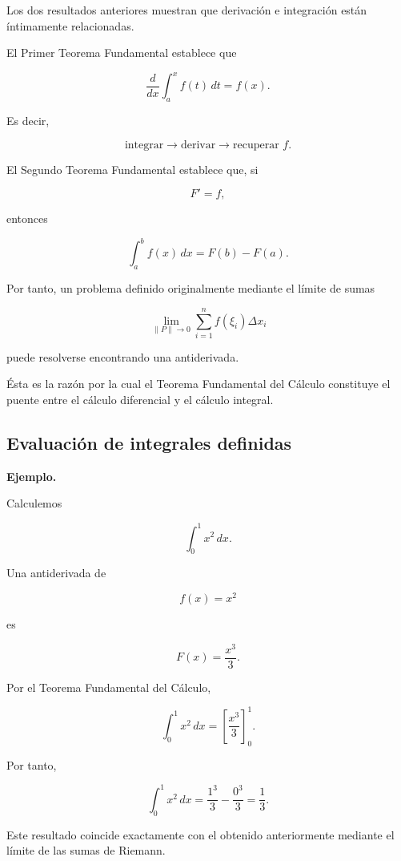 \documentclass[12pt]{article}
\newenvironment{Ejem}
{\par\medskip\noindent\textbf{Ejemplo.}\ }
{\par\medskip}
\begin{document}
Los dos resultados anteriores muestran que derivación e integración están
íntimamente relacionadas.

El Primer Teorema Fundamental establece que

\[
\boxed{
\frac{d}{dx}
\int_a^x f(t)\,dt
=
f(x).
}
\]

Es decir,

\[
\text{integrar}
\longrightarrow
\text{derivar}
\longrightarrow
\text{recuperar }f.
\]

El Segundo Teorema Fundamental establece que, si

\[
F'=f,
\]

entonces

\[
\boxed{
\int_a^b f(x)\,dx
=
F(b)-F(a).
}
\]

Por tanto, un problema definido originalmente mediante el límite de sumas

\[
\lim_{\|P\|\to0}
\sum_{i=1}^{n}f(\xi_i)\Delta x_i
\]

puede resolverse encontrando una antiderivada.

Ésta es la razón por la cual el Teorema Fundamental del Cálculo constituye
el puente entre el cálculo diferencial y el cálculo integral.

\subsection{Evaluación de integrales definidas}

\begin{Ejem}

Calculemos

\[
\int_0^1 x^2\,dx.
\]

Una antiderivada de

\[
f(x)=x^2
\]

es

\[
F(x)=\frac{x^3}{3}.
\]

Por el Teorema Fundamental del Cálculo,

\[
\int_0^1x^2\,dx
=
\left[
\frac{x^3}{3}
\right]_0^1.
\]

Por tanto,

\[
\int_0^1x^2\,dx
=
\frac{1^3}{3}
-
\frac{0^3}{3}
=
\boxed{\frac13}.
\]

Este resultado coincide exactamente con el obtenido anteriormente mediante
el límite de las sumas de Riemann.

\end{Ejem}
\end{document}
